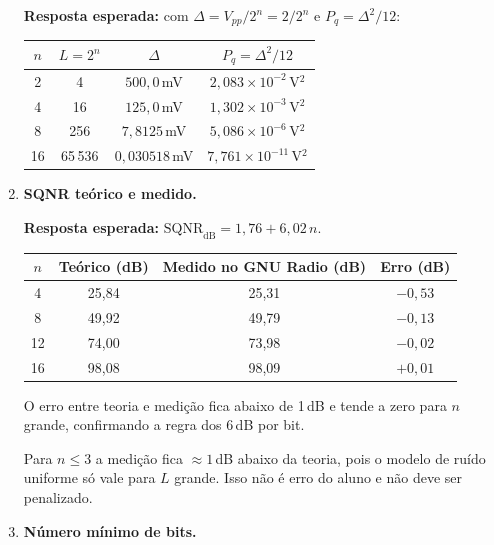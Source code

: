 \documentclass[11pt,a4paper]{article}
\begin{document}
\begin{enumerate}[label=\textbf{Q\arabic*.}, leftmargin=*, itemsep=1em]
    \textbf{Resposta esperada:} com $\Delta = V_{pp}/2^n = 2/2^n$ e
    $P_q = \Delta^2/12$:

    \begin{center}
    \begin{tabular}{c c c c}
      \toprule
      $n$ & $L = 2^n$ & $\Delta$ & $P_q = \Delta^2/12$ \\
      \midrule
      2  & 4      & $500{,}0$\,mV    & $2{,}083 \times 10^{-2}$\,V$^2$ \\
      4  & 16     & $125{,}0$\,mV    & $1{,}302 \times 10^{-3}$\,V$^2$ \\
      8  & 256    & $7{,}8125$\,mV   & $5{,}086 \times 10^{-6}$\,V$^2$ \\
      16 & 65\,536 & $0{,}030518$\,mV & $7{,}761 \times 10^{-11}$\,V$^2$ \\
      \bottomrule
    \end{tabular}
    \end{center}

  \item \textbf{SQNR teórico e medido.}

    \textbf{Resposta esperada:} $\text{SQNR}_\text{dB} = 1{,}76 + 6{,}02\,n$.

    \begin{center}
    \begin{tabular}{c c c c}
      \toprule
      $n$ & Teórico (dB) & Medido no GNU Radio (dB) & Erro (dB) \\
      \midrule
      4  & 25{,}84 & 25{,}31 & $-0{,}53$ \\
      8  & 49{,}92 & 49{,}79 & $-0{,}13$ \\
      12 & 74{,}00 & 73{,}98 & $-0{,}02$ \\
      16 & 98{,}08 & 98{,}09 & $+0{,}01$ \\
      \bottomrule
    \end{tabular}
    \end{center}
    O erro entre teoria e medição fica abaixo de 1\,dB e tende a zero para
    $n$ grande, confirmando a regra dos 6\,dB por bit.

    \begin{nota}
      Para $n \leq 3$ a medição fica $\approx 1$\,dB abaixo da teoria, pois o
      modelo de ruído uniforme só vale para $L$ grande. Isso não é erro do
      aluno e não deve ser penalizado.
    \end{nota}

  \item \textbf{Número mínimo de bits.}


\end{enumerate}
\end{document}
